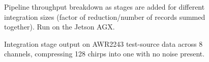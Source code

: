 \begin{figure}
   \centering
     
    \caption[Pipeline throughput breakdown on the Jetson AGX.]{Pipeline throughput breakdown as stages are added for
    different integration sizes (factor of reduction/number of records summed together). Run on the Jetson AGX.}
    \label{fig:throughput-agx}
\end{figure}

\begin{figure}
    \caption[Integration on AWR2243 test-source data.]{Integration 
    stage output on
    AWR2243 test-source data across 8 channels, compressing 128 chirps into one with
    no noise present.}
    \label{fig:integration-waterfall-orac}
\end{figure}